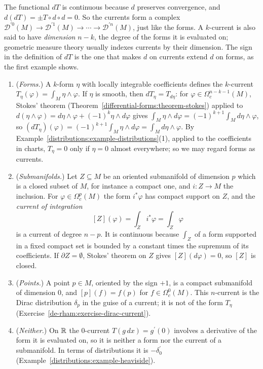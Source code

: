 The functional $dT$ is continuous because $d$ preserves convergence, and $d(dT) = \pm T \circ d \circ d = 0$. So the currents form a complex
$\mathcal{D}^{\prime 0}(M) \to \mathcal{D}^{\prime 1}(M) \to \cdots \to \mathcal{D}^{\prime n}(M)$, just like the forms. A $k$-current is also said to have \emph{dimension} $n - k$, the degree of the forms
it is evaluated on; geometric measure theory usually indexes currents by their dimension. The sign in the definition of $dT$ is the one that makes $d$ on currents extend $d$ on forms, as
the first example shows.

\begin{example}\label{de-rham:example-currents}
\begin{enumerate}
\item (\emph{Forms.}) A $k$-form $\eta$ with locally integrable coefficients defines the $k$-current $T_\eta(\varphi) = \int_M\eta \wedge \varphi$. If $\eta$ is smooth, then $dT_\eta = T_{d\eta}$:
for $\varphi \in \Omega^{n-k-1}_c(M)$, Stokes' theorem (Theorem~\ref{differential-forms:theorem-stokes}) applied to $d(\eta \wedge \varphi) = d\eta \wedge \varphi + (-1)^k\eta \wedge d\varphi$ gives
$\int_M\eta \wedge d\varphi = (-1)^{k+1}\int_Md\eta \wedge \varphi$, so $(dT_\eta)(\varphi) = (-1)^{k+1}\int_M\eta \wedge d\varphi = \int_Md\eta \wedge \varphi$. By
Example~\ref{distributions:example-distributions}(1), applied to the coefficients in charts, $T_\eta = 0$ only if $\eta = 0$ almost everywhere; so we may regard forms as currents.
\item (\emph{Submanifolds.}) Let $Z \subseteq M$ be an oriented submanifold of dimension $p$ which is a closed subset of $M$, for instance a compact one, and $i \colon Z \to M$ the inclusion. For
$\varphi \in \Omega^p_c(M)$ the form $i^*\varphi$ has compact support on $Z$, and the \emph{current of integration}
\[
[Z](\varphi) = \int_Zi^*\varphi = \int_Z\varphi
\]
is a current of degree $n - p$. It is continuous because $\int_Z$ of a form supported in a fixed compact set is bounded by a constant times the supremum of its coefficients. If
$\partial Z = \emptyset$, Stokes' theorem on $Z$ gives $[Z](d\varphi) = 0$, so $[Z]$ is closed.
\item (\emph{Points.}) A point $p \in M$, oriented by the sign $+1$, is a compact submanifold of dimension $0$, and $[p](f) = f(p)$ for $f \in \Omega^0_c(M)$. This $n$-current is the Dirac distribution
$\delta_p$ in the guise of a current; it is not of the form $T_\eta$ (Exercise~\ref{de-rham:exercise-dirac-current}).
\item (\emph{Neither.}) On $\mathbb{R}$ the $0$-current $T(g\,dx) = g^{\prime}(0)$ involves a derivative of the form it is evaluated on, so it is neither a form nor the current of a submanifold. In
terms of distributions it is $-\delta_0^{\prime}$ (Example~\ref{distributions:example-heaviside}).
\end{enumerate}
\end{example}

